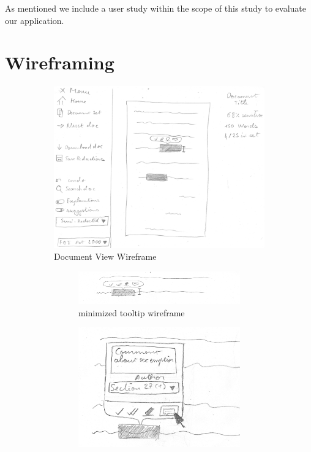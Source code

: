 \documentclass{l4proj}
\begin{document}
As mentioned we include a user study within the scope of this study to evaluate our application.

\section{Wireframing}

\begin{figure}[H]
    \centering
    \begin{subfigure}[b]{\linewidth}
        \centering
        \includegraphics[width=0.6\linewidth]{images/wireframes/doc_view.jpg}
        \caption{Document View Wireframe}
        \label{fig:document-wireframe}
    \end{subfigure}
    \begin{subfigure}[b]{\linewidth}
        \begin{subfigure}[b]{0.5\linewidth}
            \includegraphics[width=\linewidth]{images/wireframes/tooltip.jpg}
            \caption{minimized tooltip wireframe}
            \label{fig:tooltip-wireframe}
        \end{subfigure}
        \begin{subfigure}[b]{0.4\linewidth}
            \includegraphics[width=\linewidth]{images/wireframes/tooltip_comment.jpg}

\end{subfigure}
\end{subfigure}
\end{figure}
\end{document}
